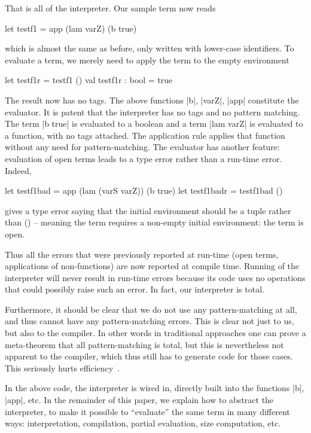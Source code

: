 \documentclass[preprint]{sigplanconf}
\let\cite=\citep
\begin{document}
\noindent That is all of the interpreter. Our sample term now reads
\begin{code}
  let testf1 = app (lam varZ) (b true)
\end{code}
which is almost the same as before, only written with lower-case
identifiers. To evaluate a term, we merely need to apply 
the term to the empty environment

\begin{code}
  let testf1r = testf1 ()
  val testf1r : bool = true
\end{code}

The result now has no tags. The above functions |b|,
|varZ|, |app| constitute the evaluator. It is patent that the
interpreter has no tags and no pattern matching. The term |b true| is
evaluated to a boolean and a term |lam varZ| is evaluated to a
function, with no tags attached. The application rule applies that
function without any need for pattern-matching. The evaluator has
another feature: evaluation of open terms leads to a type error rather
than a run-time error. Indeed, 

\begin{code}
  let testf1bad = app (lam (varS varZ)) (b true)
  let testf1badr = testf1bad ()
\end{code}
gives a type error saying 
that the initial environment should be a tuple rather than () --
meaning the term requires a non-empty initial environment: the term is
open.

Thus all the errors that were previously reported at run-time (open terms,
applications of non-functions) are now reported at compile
time. Running of the interpreter will never result in run-time errors
because its code uses no operations that could possibly raise such
an error. In fact, our interpreter is total.

Furthermore, it should be clear that we do not use any
pattern-matching at all, and thus cannot have any pattern-matching
errors.  This is clear not just to us, but also to the compiler.
In other words in traditional approaches one can prove a meta-theorem
that all pattern-matching is total, but this is nevertheless not
apparent to the compiler, which thus still has to generate code for
those cases.  This seriously hurts efficiency~\cite{WalidICFP02}.

In the above code, the interpreter is wired in, directly built into the
functions |b|, |app|, etc.  In the remainder of this paper, 
we explain how to abstract the interpreter,
to make it possible to ``evaluate'' the same term in many different
ways: interpretation, compilation, partial evaluation, size
computation, etc.
\end{document}
